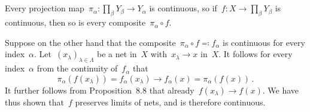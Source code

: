 \subsection{}

Every projection map~$π_α \colon ∏_β Y_β \to Y_α$ is continuous, so if~$f \colon X \to ∏_β Y_β$ is continuous, then so is every composite~$π_α ∘ f$.

Suppose on the other hand that the composite~$π_α ∘ f ≕ f_α$ is continuous for every index~$α$.
Let~$(x_λ)_{λ ∈ Λ}$ be a net in~$X$ with~$x_λ \to x$ in~$X$.
It follows for every index~$α$ from the continuity of~$f_α$ that
\[
	π_α( f(x_λ) ) = f_α(x_λ) \to f_α(x) = π_α( f(x) ) \,.
\]
It further follows from Proposition~8.8 that already~$f(x_λ) \to f(x)$.
We have thus shown that~$f$ preserves limits of nets, and is therefore continuous.
